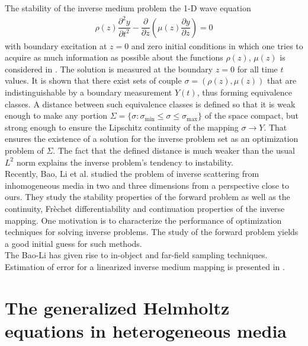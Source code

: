 \documentclass[12pt,twoside]{report}
\begin{document}
The stability of the inverse medium problem the 1-D wave equation 
\begin{align*}
\rho(z) \dfrac{\partial ^2 y}{\partial t^2}-\dfrac{\partial}{\partial z}\left( \mu(z) \dfrac{\partial y}{\partial z}\right) = 0
\end{align*}
with boundary excitation at $z=0$ and zero initial conditions in which one tries to acquire as much information as possible about the functions $\rho(z)$, $\mu(z)$ is considered in \cite{Bamberger1979}. The solution is measured at the boundary $z=0$ for all time $t$ values. It is shown that there exist sets of couple $\sigma = (\rho(z), \mu(z))$ that are indistinguishable by a boundary measurement $Y(t)$, thus forming equivalence classes. A distance between such equivalence classes is defined so that it is weak enough to make any portion $\Sigma =\{ \sigma: \sigma_{\min} \leq \sigma \leq \sigma_{\max}\}$ of the space compact, but strong enough to ensure the Lipschitz continuity of the mapping $\sigma \rightarrow Y$. That ensures the existence of a solution for the inverse problem set as an optimization problem of $\Sigma$. The fact that the defined distance is much weaker than the usual $L^2$ norm explains the inverse problem's tendency to instability. \\

Recently, Bao, Li et al. \cite{BaoLi2005} studied the problem of inverse scattering from inhomogeneous media in two and three dimensions from a perspective close to ours. They study the stability properties of the forward problem as well as the continuity, Fr\`echet differentiability and continuation properties of the inverse mapping. One motivation \cite{BaoHouLi2007} is to characterize the performance of optimization techniques for solving inverse problems. The study of the forward problem yields a good initial guess for such methods. \\
The Bao-Li has given rise to in-object \cite{ItoJinZou2012} and far-field \cite{LiZou2012} sampling techniques. Estimation of error for a linearized inverse medium mapping is presented in \cite{Bao2010}.





\chapter{The generalized Helmholtz equations in heterogeneous media}
\end{document}
